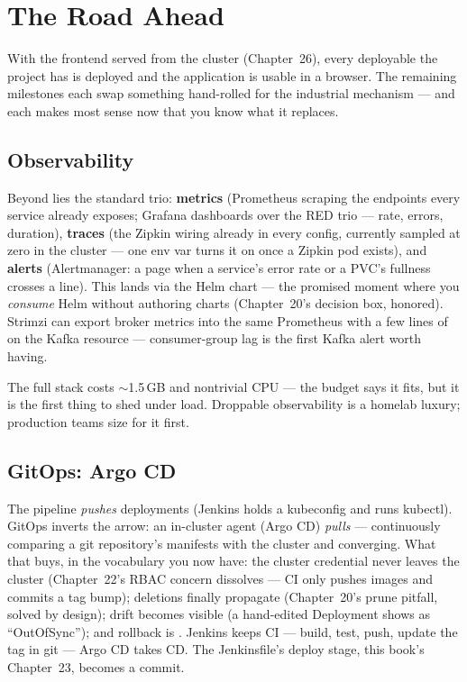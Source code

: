\chapter{The Road Ahead}
\label{ch:roadahead}

With the frontend served from the cluster (Chapter~26), every
deployable the project has is deployed and the application is usable
in a browser. The remaining milestones each swap something hand-rolled
for the industrial mechanism --- and each makes most sense now that you
know what it replaces.

\section{Observability}

Beyond  lies the standard trio: \textbf{metrics}
(Prometheus scraping the  endpoints every
service already exposes; Grafana dashboards over the RED trio ---
rate, errors, duration), \textbf{traces} (the Zipkin wiring already in
every config, currently sampled at zero in the cluster --- one env var
turns it on once a Zipkin pod exists), and \textbf{alerts}
(Alertmanager: a page when a service's error rate or a PVC's fullness
crosses a line). This lands via the  Helm
chart --- the promised moment where you \emph{consume} Helm without
authoring charts (Chapter~20's decision box, honored). Strimzi can
export broker metrics into the same Prometheus with a few lines of
 on the Kafka resource --- consumer-group lag is
the first Kafka alert worth having.

\begin{hardware}
The full stack costs $\sim$1.5\,GB and nontrivial CPU --- the budget
says it fits, but it is the first thing to shed under load. Droppable
observability is a homelab luxury; production teams size for it first.
\end{hardware}

\section{GitOps: Argo CD}

The pipeline \emph{pushes} deployments (Jenkins holds a kubeconfig and
runs kubectl). GitOps inverts the arrow: an in-cluster agent
(Argo CD) \emph{pulls} --- continuously comparing a git repository's
manifests with the cluster and converging. What that buys, in the
vocabulary you now have: the cluster credential never leaves the
cluster (Chapter~22's RBAC concern dissolves --- CI only pushes images
and commits a tag bump); deletions finally propagate (Chapter~20's
prune pitfall, solved by design); drift becomes visible (a hand-edited
Deployment shows as ``OutOfSync''); and rollback is .
Jenkins keeps CI --- build, test, push, update the tag in git ---
Argo CD takes CD. The Jenkinsfile's deploy stage, this book's
Chapter~23, becomes a commit.

